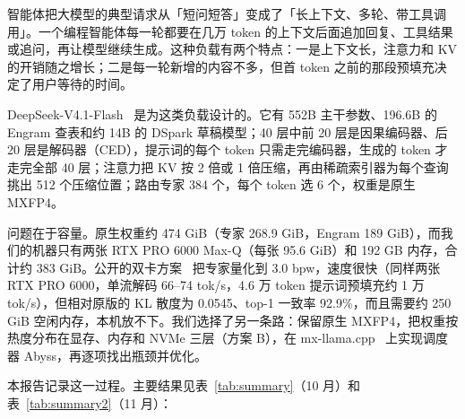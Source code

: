 \documentclass[11pt,a4paper]{article}
\newcommand{\tps}{tok/s}
\begin{document}
智能体把大模型的典型请求从「短问短答」变成了「长上下文、多轮、带工具调用」。一个编程智能体每一轮都要在几万 token 的上下文后面追加回复、工具结果或追问，再让模型继续生成。这种负载有两个特点：一是上下文长，注意力和 KV 的开销随之增长；二是每一轮新增的内容不多，但首 token 之前的那段预填充决定了用户等待的时间。

DeepSeek-V4.1-Flash~\cite{v41} 是为这类负载设计的。它有 552B 主干参数、196.6B 的 Engram 查表和约 14B 的 DSpark 草稿模型；40 层中前 20 层是因果编码器、后 20 层是解码器（CED），提示词的每个 token 只需走完编码器，生成的 token 才走完全部 40 层；注意力把 KV 按 2 倍或 1 倍压缩，再由稀疏索引器为每个查询挑出 512 个压缩位置；路由专家 384 个，每个 token 选 6 个，权重是原生 MXFP4。

问题在于容量。原生权重约 474 GiB（专家 268.9 GiB，Engram 189 GiB），而我们的机器只有两张 RTX PRO 6000 Max-Q（每张 95.6 GiB）和 192 GB 内存，合计约 383 GiB。公开的双卡方案~\cite{diffbot} 把专家量化到 3.0 bpw，速度很快（同样两张 RTX PRO 6000，单流解码 66--74 \tps{}，4.6 万 token 提示词预填充约 1 万 \tps{}），但相对原版的 KL 散度为 0.0545、top-1 一致率 92.9\%，而且需要约 250 GiB 空闲内存，本机放不下。我们选择了另一条路：保留原生 MXFP4，把权重按热度分布在显存、内存和 NVMe 三层（方案 B），在 mx-llama.cpp~\cite{mxllama} 上实现调度器 Abyss，再逐项找出瓶颈并优化。

本报告记录这一过程。主要结果见表~\ref{tab:summary}（10 月）和表~\ref{tab:summary2}（11 月）：
\end{document}
